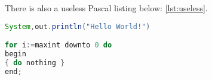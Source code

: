 \lipsum[18]

There is also a useless Pascal listing below: \autoref{lst:useless}.

\begin{lstlisting}[float=b,language=Java,frame=tb,caption={A floating example (\texttt{listings} manual)},label=lst:useless]
System,out.println("Hello World!")

for i:=maxint downto 0 do
begin
{ do nothing }
end;
\end{lstlisting}
